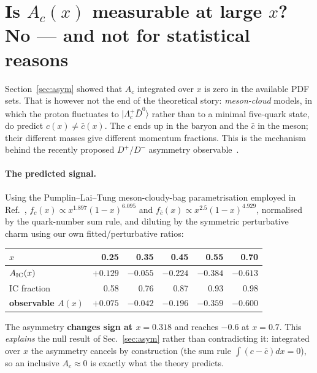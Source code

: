 \documentclass[11pt,a4paper]{article}
\begin{document}
\section{Is $A_c(x)$ measurable at large $x$? No --- and not for statistical reasons}
\label{sec:acx}

Section~\ref{sec:asym} showed that $A_c$ integrated over $x$ is zero in the
available PDF sets. That is however not the end of the theoretical story:
\emph{meson-cloud} models, in which the proton fluctuates to
$|\Lambda_c^+ \bar{D}^0\rangle$ rather than to a minimal five-quark state, do
predict $c(x)\neq\bar{c}(x)$. The $c$ ends up in the baryon and the $\bar{c}$ in
the meson; their different masses give different momentum fractions. This is the
mechanism behind the recently proposed $D^+/D^-$ asymmetry
observable~\cite{lykasov}.

\paragraph{The predicted signal.} Using the Pumplin--Lai--Tung meson-cloudy-bag
parametrisation employed in Ref.~\cite{lykasov},
$f_c(x)\propto x^{1.897}(1-x)^{6.095}$ and
$f_{\bar c}(x)\propto x^{2.5}(1-x)^{4.929}$, normalised by the quark-number sum
rule, and diluting by the symmetric perturbative charm using our own
fitted/perturbative ratios:

\begin{center}\small
\begin{tabular}{lrrrrr}
\toprule
$x$ & 0.25 & 0.35 & 0.45 & 0.55 & 0.70 \\
\midrule
$A_{\rm IC}(x)$ & $+0.129$ & $-0.055$ & $-0.224$ & $-0.384$ & $-0.613$ \\
IC fraction & 0.58 & 0.76 & 0.87 & 0.93 & 0.98 \\
\textbf{observable $A(x)$} & $+0.075$ & $-0.042$ & $-0.196$ & $-0.359$ & $-0.600$ \\
\bottomrule
\end{tabular}
\end{center}

\noindent
The asymmetry \textbf{changes sign at $x=0.318$} and reaches $-0.6$ at $x=0.7$.
This \emph{explains} the null result of Sec.~\ref{sec:asym} rather than
contradicting it: integrated over $x$ the asymmetry cancels by construction
(the sum rule $\int(c-\bar{c})dx=0$), so an inclusive $A_c\approx0$ is exactly
what the theory predicts.
\end{document}
